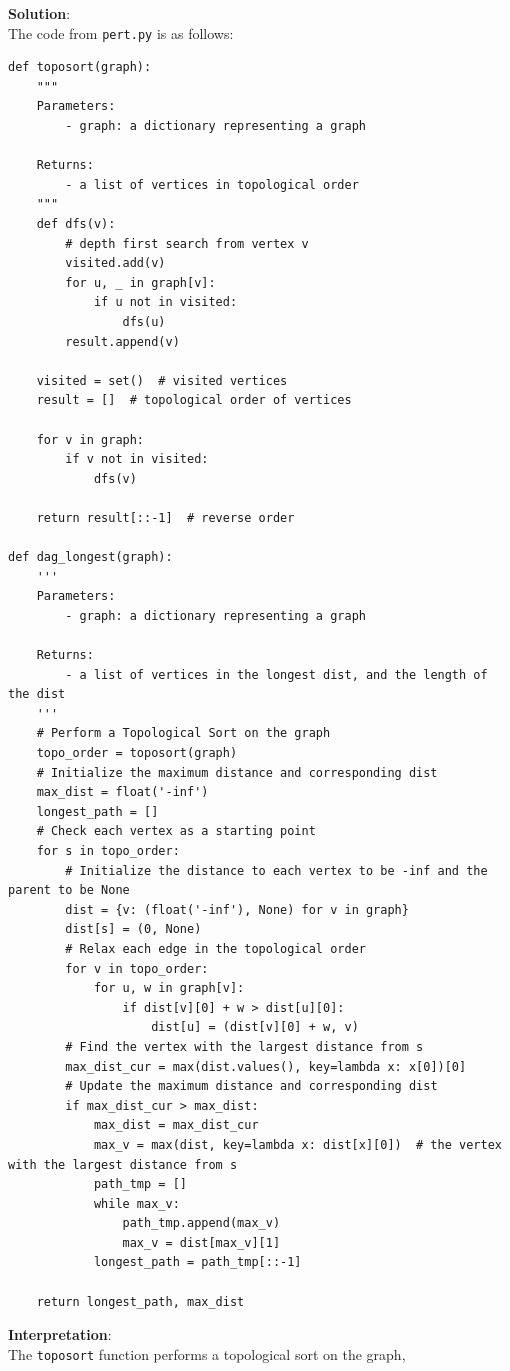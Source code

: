 \documentclass[UTF8]{ctexart}
\begin{document}
\textbf{\large Solution}:\\
The code from \texttt{pert.py} is as follows:
\begin{lstlisting}
def toposort(graph):
    """
    Parameters:
        - graph: a dictionary representing a graph
        
    Returns:
        - a list of vertices in topological order
    """
    def dfs(v):
        # depth first search from vertex v
        visited.add(v)
        for u, _ in graph[v]:
            if u not in visited:
                dfs(u)
        result.append(v)

    visited = set()  # visited vertices
    result = []  # topological order of vertices

    for v in graph:
        if v not in visited:
            dfs(v)

    return result[::-1]  # reverse order

def dag_longest(graph):
    '''
    Parameters:
        - graph: a dictionary representing a graph
        
    Returns:
        - a list of vertices in the longest dist, and the length of the dist
    '''
    # Perform a Topological Sort on the graph
    topo_order = toposort(graph)
    # Initialize the maximum distance and corresponding dist
    max_dist = float('-inf')
    longest_path = []
    # Check each vertex as a starting point
    for s in topo_order:
        # Initialize the distance to each vertex to be -inf and the parent to be None
        dist = {v: (float('-inf'), None) for v in graph}
        dist[s] = (0, None)
        # Relax each edge in the topological order
        for v in topo_order:
            for u, w in graph[v]:
                if dist[v][0] + w > dist[u][0]:
                    dist[u] = (dist[v][0] + w, v)
        # Find the vertex with the largest distance from s
        max_dist_cur = max(dist.values(), key=lambda x: x[0])[0]
        # Update the maximum distance and corresponding dist
        if max_dist_cur > max_dist:
            max_dist = max_dist_cur
            max_v = max(dist, key=lambda x: dist[x][0])  # the vertex with the largest distance from s
            path_tmp = []
            while max_v:
                path_tmp.append(max_v)
                max_v = dist[max_v][1]
            longest_path = path_tmp[::-1]
    
    return longest_path, max_dist
\end{lstlisting}
\textbf{\large Interpretation}:\\
The \texttt{toposort} function performs a topological sort on the graph, 
\end{document}
